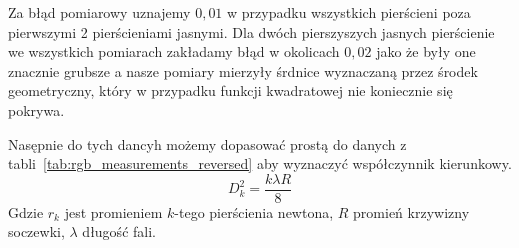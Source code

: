 \documentclass[12pt]{article}
\begin{document}
Za błąd pomiarowy uznajemy \(0{,}01\) w przypadku wszystkich pierścieni poza pierwszymi 2 pierścieniami jasnymi.
Dla dwóch pierszyszych jasnych pierścienie we wszystkich pomiarach zakładamy błąd w okolicach \(0{,}02\) jako że były one znacznie grubsze a nasze pomiary mierzyły śrdnice wyznaczaną przez środek geometryczny, który w przypadku funkcji kwadratowej nie koniecznie się pokrywa.

Nasępnie do tych dancyh możemy dopasować prostą do danych z tabli~\ref{tab:rgb_measurements_reversed} aby wyznaczyć współczynnik kierunkowy.
\begin{equation}
	D_k^2 = \frac{k \lambda R}{8}
	\label{eq:radious}
\end{equation}
Gdzie \(r_k\) jest promieniem \(k\)-tego pierścienia newtona, \(R\) promień krzywizny soczewki, \(\lambda\) długość fali.
\end{document}

